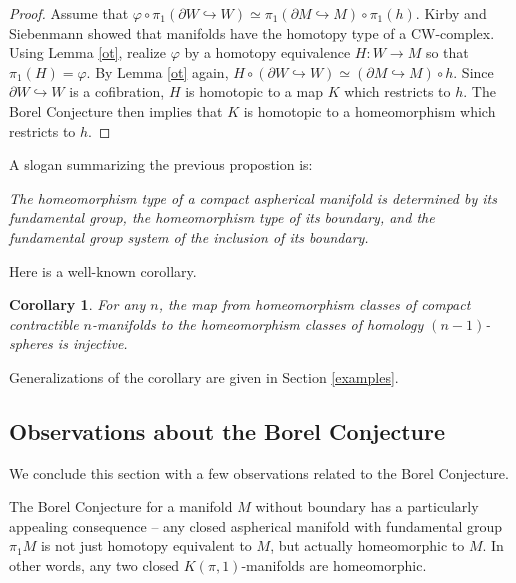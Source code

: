 \documentclass[12pt]{amsart}
\newtheorem{corollary}[theorem]{Corollary}
\theoremstyle{definition}
\begin{document}
\begin{proof} Assume that   $\varphi \circ \pi_1(\partial W \hookrightarrow W) \simeq  \pi_1(\partial M\hookrightarrow M) \circ \pi_1(h)$.   Kirby and Siebenmann \cite{KS} showed that manifolds  have the homotopy type of a CW-complex. Using Lemma \ref{ot}, realize $\varphi$ by a homotopy equivalence $H : W \to M$ so that $\pi_1(H) = \varphi$.   By Lemma \ref{ot} again, 
$H \circ (\partial W \hookrightarrow W)\simeq (\partial M\hookrightarrow M) \circ h$.   Since $\partial W \hookrightarrow W$ is a cofibration, $H$ is homotopic to a map $K$ which restricts to $h$.    The Borel Conjecture then implies that $K$ is homotopic to a homeomorphism which restricts to $h$.
\end{proof}







A slogan summarizing the previous propostion is:
\medskip

{\em The homeomorphism type of a compact aspherical manifold is determined by its fundamental group, the homeomorphism type of its boundary, and the fundamental group system of the inclusion of its boundary. }

Here is a well-known corollary.

\begin{corollary}
  For any $n$,  the map from homeomorphism classes of compact contractible $n$-manifolds to the homeomorphism classes of homology $(n-1)$-spheres is injective.
\end{corollary}


Generalizations of the corollary are given in Section \ref{examples}.   


\subsection{Observations about the Borel Conjecture}



We conclude this section with a few observations related to the Borel Conjecture.  

The Borel Conjecture for a manifold $M$ without boundary has a particularly appealing consequence -- any closed aspherical manifold with fundamental group $\pi_1M$ is not just homotopy equivalent to $M$, but actually homeomorphic to $M$.   In other words, any two closed $K(\pi,1)$-manifolds are homeomorphic.   
\end{document}
